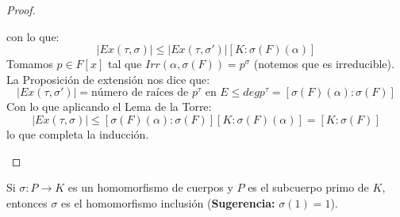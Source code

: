 \begin{prop}
\begin{proof}
\begin{itemize}
                con lo que:
                \begin{equation*}
                    |Ex(\tau,\sigma)| \leq |Ex(\tau,\sigma')| [K:\sigma(F)(\alpha)]
                \end{equation*}
                Tomamos $p\in F[x]$ tal que $Irr(\alpha,\sigma(F)) = p^\sigma$ (notemos que es irreducible). La Proposición de extensión nos dice que:
                \begin{equation*}
                    |Ex(\tau,\sigma')| = \text{número de raíces de\ } p^\tau \text{\ en\ } E \leq deg p^\tau = [\sigma(F)(\alpha):\sigma(F)]
                \end{equation*}
                Con lo que aplicando el Lema de la Torre:
                \begin{equation*}
                    |Ex(\tau,\sigma)| \leq [\sigma(F)(\alpha):\sigma(F)][K:\sigma(F)(\alpha)] = [K:\sigma(F)]
                \end{equation*}
                lo que completa la inducción.
        \end{itemize}
    \end{proof}
\end{prop}


\begin{ejercicio} %
    Si $\sigma:P\to K$ es un homomorfismo de cuerpos y $P$ es el subcuerpo primo de $K$, entonces $\sigma$ es el homomorfismo inclusión (\textbf{Sugerencia:} $\sigma(1)=1$).
\end{ejercicio}

